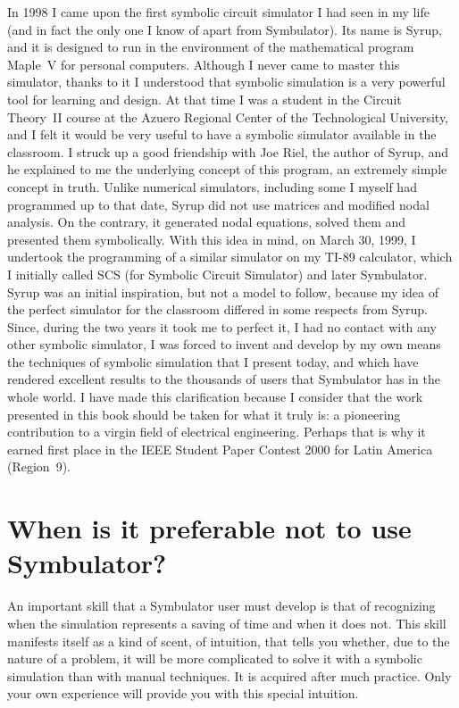 In 1998 I came upon the first symbolic circuit simulator I had seen
in my life (and in fact the only one I know of apart from
Symbulator). Its name is Syrup, and it is designed to run in the
environment of the mathematical program Maple~V for personal
computers. Although I never came to master this simulator, thanks to
it I understood that symbolic simulation is a very powerful tool for
learning and design. At that time I was a student in the Circuit
Theory~II course at the Azuero Regional Center of the Technological
University, and I felt it would be very useful to have a symbolic
simulator available in the classroom. I struck up a good friendship
with Joe Riel, the author of Syrup, and he explained to me the
underlying concept of this program, an extremely simple concept in
truth. Unlike numerical simulators, including some I myself had
programmed up to that date, Syrup did not use matrices and modified
nodal analysis. On the contrary, it generated nodal equations,
solved them and presented them symbolically. With this idea in mind,
on March 30, 1999, I undertook the programming of a similar
simulator on my TI-89 calculator, which I initially called SCS (for
Symbolic Circuit Simulator) and later Symbulator. Syrup was an
initial inspiration, but not a model to follow, because my idea of
the perfect simulator for the classroom differed in some respects
from Syrup. Since, during the two years it took me to perfect it, I
had no contact with any other symbolic simulator, I was forced to
invent and develop by my own means the techniques of symbolic
simulation that I present today, and which have rendered excellent
results to the thousands of users that Symbulator has in the whole
world. I have made this clarification because I consider that the
work presented in this book should be taken for what it truly is: a
pioneering contribution to a virgin field of electrical engineering.
Perhaps that is why it earned first place in the IEEE Student Paper
Contest 2000 for Latin America (Region~9).

\chapter{When is it preferable not to use Symbulator?}

An important skill that a Symbulator user must develop is that of
recognizing when the simulation represents a saving of time and when
it does not. This skill manifests itself as a kind of scent, of
intuition, that tells you whether, due to the nature of a problem,
it will be more complicated to solve it with a symbolic simulation
than with manual techniques. It is acquired after much practice.
Only your own experience will provide you with this special
intuition.

